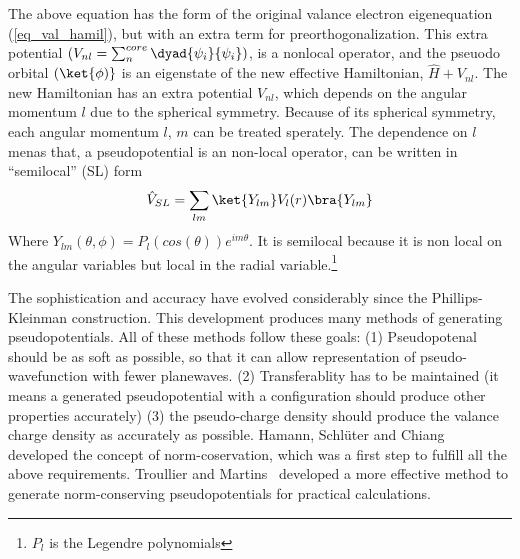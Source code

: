 The above equation has the form of the original valance electron eigenequation (\ref{eq_val_hamil}), but with an extra term for preorthogonalization. This extra potential $(V_{nl} = \sum_n^{core} \dyad{\psi_i}{\psi_i})$, is a nonlocal operator, and the pseuodo orbital $(\ket{\phi)}$ is an eigenstate of the new effective Hamiltonian, $\hat{H} + V_{nl}$. The new Hamiltonian has an extra potential $V_{nl}$, which depends on the angular momentum $l$ due to the spherical symmetry. Because of its spherical symmetry, each angular momentum $l$, $m$ can be treated sperately. The dependence on $l$ menas that, a pseudopotential is an non-local operator, can be written in ``semilocal'' (SL) form
\begin{equation}
\label{eq_sl}
\hat{V}_{SL} = \sum_{lm} \ket{Y_{lm}}V_l(r)\bra{Y_{lm}}
\end{equation}
Where $Y_{lm}(\theta,\phi) = P_l(cos(\theta))e^{im\theta}$. It is semilocal because it is non local on the angular variables but local in the radial variable.\footnote{$P_l$ is the Legendre polynomials}


The sophistication and accuracy have evolved considerably since the Phillips-Kleinman construction. This development produces many methods of generating pseudopotentials. All of these methods follow these goals: (1) Pseudopotenal should be as soft as possible, so that it can allow representation of pseudo-wavefunction with fewer planewaves. (2) Transferablity has to be maintained (it means a generated pseudopotential with a configuration should produce other properties accurately) (3) the pseudo-charge density should produce the valance charge density as accurately as possible. Hamann, Schl\"uter and Chiang~\cite{hamann1979norm} developed the concept of norm-coservation, which was a first step to fulfill all the above requirements. Troullier and Martins~\cite{troullier1991efficient} developed a more effective method to generate norm-conserving pseudopotentials for practical calculations.

